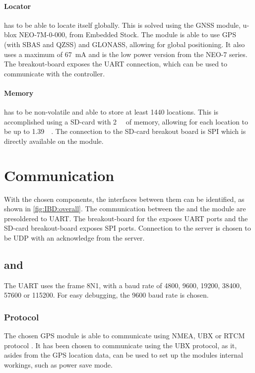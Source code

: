 \paragraph{Locator} has to be able to locate itself globally. This is solved using the GNSS module, u-blox NEO-7M-0-000, from Embedded Stock.
The module is able to use GPS (with SBAS and QZSS) and GLONASS, allowing for global positioning.
It also uses a maximum of \SI{67}{\milli\ampere} \cite[p.~17]{NEO7_Data} and is the low power version from the NEO-7 series.
The breakout-board exposes the UART connection, which can be used to communicate with the controller.

\paragraph{Memory} has to be non-volatile and able to store at least 1440 locations.
This is accomplished using a SD-card with \SI{2}{\giga\byte} of memory, allowing for each location to be up to \SI{1.39}{\mega\byte}.
The connection to the \SDsock SD-card breakout board\cite{Ciseco} is SPI which is directly available on the \MKR module.

\section{Communication}
With the chosen components, the interfaces between them can be identified, as shown in \cref{fig:IBD:overall}.
The communication between the \SAMD and the \SARA module are presoldered to UART.
The breakout-board for the \GPS exposes UART ports and the SD-card breakout-board exposes SPI ports.
Connection to the server is chosen to be UDP with an acknowledge from the server.

\subsection{\MKR and \GPS}
The \GPS UART uses the frame 8N1, with a baud rate of \num{4800}, \num{9600}, \num{19200}, \num{38400}, \num{57600} or \num{115200}.
For easy debugging, the \num{9600} baud rate is chosen.

\subsubsection{Protocol}
\label{sec:UBXprot}
The chosen GPS module is able to communicate using NMEA, UBX or RTCM protocol \cite{NEO7_proto}.
It has been chosen to communicate using the UBX protocol, as it, asides from the GPS location data, can be used to set up the modules internal workings, such as power save mode.

